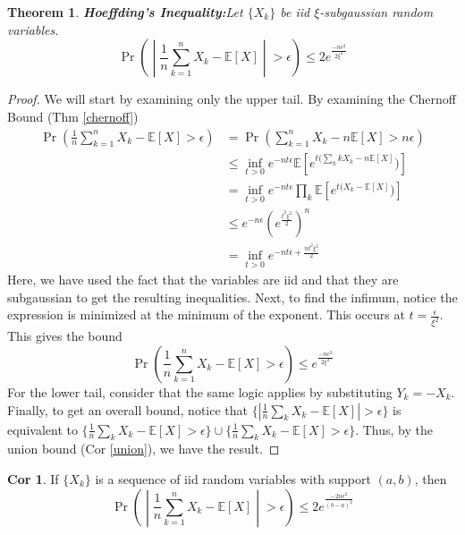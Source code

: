 \documentclass{article}
\newtheorem{theorem}{Theorem}
\theoremstyle{definition}\newtheorem{definition}{DEF}
\theoremstyle{lemma}\newtheorem{lemma}{Lemma}
\theoremstyle{corrolary}\newtheorem{corrolary}{Cor}
\begin{document}
\begin{theorem}
\textbf{Hoeffding's Inequality:}\label{HoefdingInequality}
Let $\{X_k\}$ be iid $\xi$-subgaussian random variables.
\begin{equation}
\Pr\left(\middle|\frac{1}{n}\sum_{k=1}^n X_k - \mathbb{E}[X]\middle|> \epsilon\right)\leq 2e^\frac{-n\epsilon^2}{2\xi^2}
\end{equation}
\end{theorem}
\begin{proof}
We will start by examining only the upper tail.
By examining the Chernoff Bound (Thm \ref{chernoff})
\begin{align*}
\Pr\left(\frac{1}{n}\sum_{k=1}^n X_k - \mathbb{E}[X]> \epsilon\right) &= \Pr\left(\sum_{k=1}^n X_k - n\mathbb{E}[X]> n\epsilon\right) \\
&\leq \inf_{t>0}e^{-nt\epsilon}\mathbb{E}[e^{t(\sum_kk  X_k -n\mathbb{E}[X]})]\\
&= \inf_{t>0}e^{-nt\epsilon}\prod_k \mathbb{E}[e^{t(X_k-\mathbb{E}[X]})]\\
&\leq e^{-n\epsilon}\left(e^\frac{t^2\xi^2}{2} \right)^n\\
&=\inf_{t>0}e^{-nt\epsilon+\frac{nt^2\xi^2}{2}}
\end{align*}
Here, we have used the fact that the variables are iid and that they are subgaussian to get the resulting inequalities.
Next, to find the infimum, notice the expression is minimized at the minimum of the exponent.
This occurs at $t=\frac{\epsilon}{\xi^2}$.
This gives the bound
\begin{equation*}
\Pr\left(\frac{1}{n}\sum_{k=1}^n X_k - \mathbb{E}[X]> \epsilon\right)\leq e^\frac{-n\epsilon^2}{2\xi^2}
\end{equation*}
For the lower tail, consider that the same logic applies by substituting $Y_k=-X_k$.
Finally, to get an overall bound, notice that $\{| \frac{1}{n} \sum_k X_k - \mathbb{E}[X]|>\epsilon\}$ is equivalent to $\{ \frac{1}{n} \sum_k X_k - \mathbb{E}[X]>\epsilon\}\cup \{ \frac{1}{n} \sum_k X_k - \mathbb{E}[X]>\epsilon\}$.
Thus, by the union bound (Cor \ref{union}), we have the result.
\end{proof}
\begin{corrolary}
If $\{X_k\}$ is a sequence of iid random variables with support $(a,b)$, then
\begin{equation}
\Pr\left(\middle|\frac{1}{n}\sum_{k=1}^n X_k - \mathbb{E}[X]\middle|> \epsilon\right)\leq 2e^\frac{-2 n\epsilon^2}{(b-a)^2}
\end{equation}
\end{corrolary}
\end{document}

